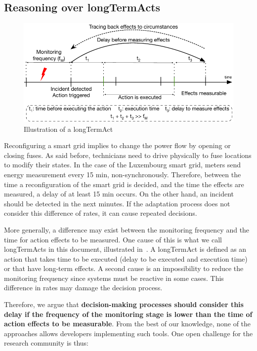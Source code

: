 \subsection[Reasoning over long-term actions]{Reasoning over \glspl{longTermAct}}
\label{sec:intro:challenges:longTermAct}

\begin{figure}
	\centering
	\includegraphics[width=0.9\linewidth]{img/chapt-intro/challenges/longTermAct}
	\caption{Illustration of a \gls{longTermAct}}
	\label{fig:intro:chal:longTermAct}
\end{figure}

Reconfiguring a smart grid implies to change the power flow by opening or closing fuses.
As said before, technicians need to drive physically to fuse locations to modify their states.
In the case of the Luxembourg smart grid, meters send energy measurement every 15 min, non-synchronously.
Therefore, between the time a reconfiguration of the smart grid is decided, and the time the effects are measured, a delay of at least 15 min occurs.
On the other hand, an incident should be detected in the next minutes.
If the adaptation process does not consider this difference of rates, it can cause repeated decisions.

More generally, a difference may exist between the monitoring frequency and the time for action effects to be measured.
One cause of this is what we call \glspl{longTermAct} in this document, illustrated in~.
A \gls{longTermAct} is defined as an \gls{action} that takes time to be executed  (delay to be executed and execution time) or that have long-term effects.
A second cause is an impossibility to reduce the monitoring frequency since systems must be reactive in some cases.
This difference in rates may damage the decision process.

Therefore, we argue that \textbf{decision-making processes should consider this delay if the frequency of the monitoring stage is lower than the time of action effects to be measurable}.
From the best of our knowledge, none of the approaches allows developers implementing such tools.
One open challenge for the research community is thus:
\vspace{-2em}


